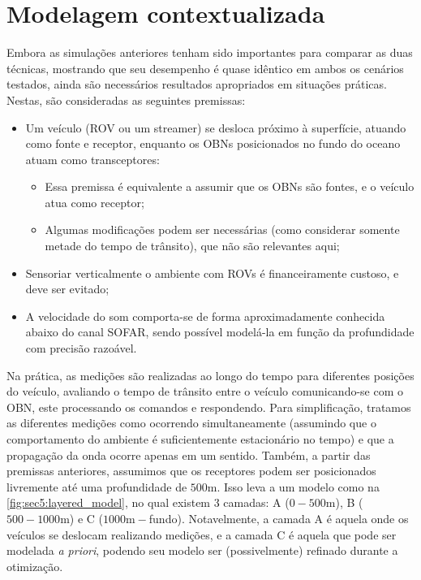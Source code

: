 \section{Modelagem contextualizada}



Embora as simulações anteriores tenham sido importantes para comparar as duas técnicas, mostrando que seu desempenho é quase idêntico em ambos os cenários testados, ainda são necessários resultados apropriados em situações práticas. Nestas, são consideradas as seguintes premissas:
\begin{itemize}
	\item Um veículo (ROV ou um streamer) se desloca próximo à superfície, atuando como fonte e receptor, enquanto os OBNs posicionados no fundo do oceano atuam como transceptores:
	\begin{itemize}
		\item Essa premissa é equivalente a assumir que os OBNs são fontes, e o veículo atua como receptor;
		\item Algumas modificações podem ser necessárias (como considerar somente metade do tempo de trânsito), que não são relevantes aqui;
	\end{itemize}
	\item Sensoriar verticalmente o ambiente com ROVs é financeiramente custoso, e deve ser evitado;
	\item A velocidade do som comporta-se de forma aproximadamente conhecida abaixo do canal SOFAR, sendo possível modelá-la em função da profundidade com precisão razoável.
\end{itemize}



Na prática, as medições são realizadas ao longo do tempo para diferentes posições do veículo, avaliando o tempo de trânsito entre o veículo comunicando-se com o OBN, este processando os comandos e respondendo. Para simplificação, tratamos as diferentes medições como ocorrendo simultaneamente (assumindo que o comportamento do ambiente é suficientemente estacionário no tempo) e que a propagação da onda ocorre apenas em um sentido. Também, a partir das premissas anteriores, assumimos que os receptores podem ser posicionados livremente até uma profundidade de $500\si{\meter}$. Isso leva a um modelo como na \cref{fig:sec5:layered_model}, no qual existem 3 camadas: A ($0-500\si{\meter}$), B ($500-1000\si{\meter}$) e C ($1000\si{\meter}-$fundo). Notavelmente, a camada A é aquela onde os veículos se deslocam realizando medições, e a camada C é aquela que pode ser modelada \textit{a priori}, podendo seu modelo ser (possivelmente) refinado durante a otimização.

